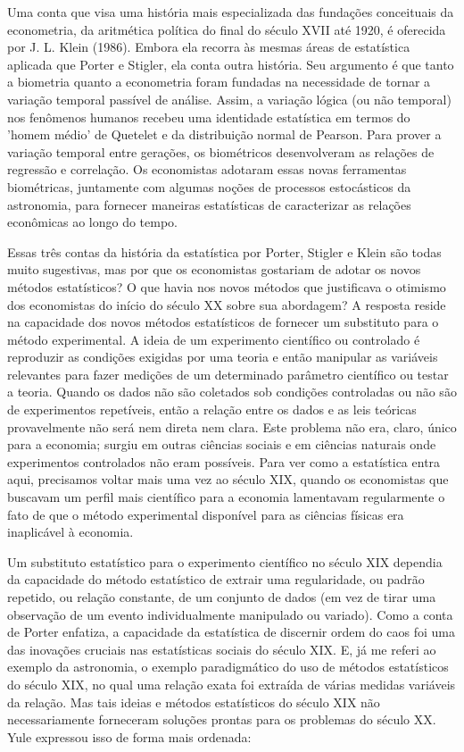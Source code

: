 \documentclass[12pt]{article}
\begin{document}
Uma conta que visa uma história mais especializada das fundações conceituais da econometria, da aritmética política do final do século XVII até 1920, é oferecida por J. L. Klein (1986). Embora ela recorra às mesmas áreas de estatística aplicada que Porter e Stigler, ela conta outra história. Seu argumento é que tanto a biometria quanto a econometria foram fundadas na necessidade de tornar a variação temporal passível de análise. Assim, a variação lógica (ou não temporal) nos fenômenos humanos recebeu uma identidade estatística em termos do 'homem médio' de Quetelet e da distribuição normal de Pearson. Para prover a variação temporal entre gerações, os biométricos desenvolveram as relações de regressão e correlação. Os economistas adotaram essas novas ferramentas biométricas, juntamente com algumas noções de processos estocásticos da astronomia, para fornecer maneiras estatísticas de caracterizar as relações econômicas ao longo do tempo.

Essas três contas da história da estatística por Porter, Stigler e Klein são todas muito sugestivas, mas por que os economistas gostariam de adotar os novos métodos estatísticos? O que havia nos novos métodos que justificava o otimismo dos economistas do início do século XX sobre sua abordagem? A resposta reside na capacidade dos novos métodos estatísticos de fornecer um substituto para o método experimental. A ideia de um experimento científico ou controlado é reproduzir as condições exigidas por uma teoria e então manipular as variáveis relevantes para fazer medições de um determinado parâmetro científico ou testar a teoria. Quando os dados não são coletados sob condições controladas ou não são de experimentos repetíveis, então a relação entre os dados e as leis teóricas provavelmente não será nem direta nem clara. Este problema não era, claro, único para a economia; surgiu em outras ciências sociais e em ciências naturais onde experimentos controlados não eram possíveis. Para ver como a estatística entra aqui, precisamos voltar mais uma vez ao século XIX, quando os economistas que buscavam um perfil mais científico para a economia lamentavam regularmente o fato de que o método experimental disponível para as ciências físicas era inaplicável à economia.

Um substituto estatístico para o experimento científico no século XIX dependia da capacidade do método estatístico de extrair uma regularidade, ou padrão repetido, ou relação constante, de um conjunto de dados (em vez de tirar uma observação de um evento individualmente manipulado ou variado). Como a conta de Porter enfatiza, a capacidade da estatística de discernir ordem do caos foi uma das inovações cruciais nas estatísticas sociais do século XIX. E, já me referi ao exemplo da astronomia, o exemplo paradigmático do uso de métodos estatísticos do século XIX, no qual uma relação exata foi extraída de várias medidas variáveis da relação. Mas tais ideias e métodos estatísticos do século XIX não necessariamente forneceram soluções prontas para os problemas do século XX. Yule expressou isso de forma mais ordenada:
\end{document}
